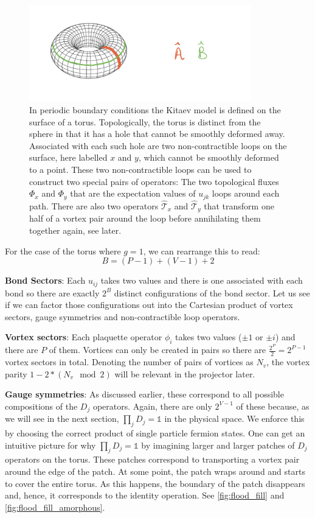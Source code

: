 \hypertarget{fig:torus}{%
\begin{figure}
\centering
\includegraphics[width=0.86\textwidth,height=\textheight]{figure_code/amk_chapter/torus.jpeg}
\caption[{Loops on the Torus}]{In periodic boundary conditions the Kitaev model is defined on the surface of a torus. Topologically, the torus is distinct from the sphere in that it has a hole that cannot be smoothly deformed away. Associated with each such hole are two non-contractible loops on the surface, here labelled \(x\) and \(y\), which cannot be smoothly deformed to a point. These two non-contractible loops can be used to construct two special pairs of operators: The two topological fluxes \(\Phi_x\) and \(\Phi_y\) that are the expectation values of \(u_{jk}\) loops around each path. There are also two operators \(\hat{\mathcal{T}}_x\) and \(\hat{\mathcal{T}}_y\) that transform one half of a vortex pair around the loop before annihilating them together again, see later.}
\label{fig:torus}
\end{figure}
}

For the case of the torus where \(g = 1\), we can rearrange this to read: \[B = (P-1) + (V-1) + 2\]

\textbf{Bond Sectors}: Each \(u_{ij}\) takes two values and there is one associated with each bond so there are exactly \(2^B\) distinct configurations of the bond sector. Let us see if we can factor those configurations out into the Cartesian product of vortex sectors, gauge symmetries and non-contractible loop operators.

\textbf{Vortex sectors}: Each plaquette operator \(\phi_i\) takes two values (\(\pm 1\) or \(\pm i\)) and there are \(P\) of them. Vortices can only be created in pairs so there are \(\tfrac{2^P}{2} = 2^{P-1}\) vortex sectors in total. Denoting the number of pairs of vortices as \(N_v\), the vortex parity \(1 - 2*(N_v \mod 2)\) will be relevant in the projector later.

\textbf{Gauge symmetries}: As discussed earlier, these correspond to all possible compositions of the \(D_j\) operators. Again, there are only \(2^{V-1}\) of these because, as we will see in the next section, \(\prod_{j} D_j = \mathbb{1}\) in the physical space. We enforce this by choosing the correct product of single particle fermion states. One can get an intuitive picture for why \(\prod_{j} D_j = \mathbb{1}\) by imagining larger and larger patches of \(D_j\) operators on the torus. These patches correspond to transporting a vortex pair around the edge of the patch. At some point, the patch wraps around and starts to cover the entire torus. As this happens, the boundary of the patch disappears and, hence, it corresponds to the identity operation. See \cref{fig:flood_fill} and \cref{fig:flood_fill_amorphous}.

